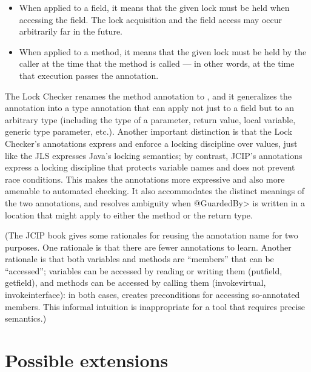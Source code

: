 \begin{itemize}
\item
  When applied to a field, it means that the given lock must be held when
  accessing the field.  The lock acquisition and the field access may occur
  arbitrarily far in the future.
\item
  When applied to a method, it means that the given lock must be held by
  the caller at the time that the method is called --- in other words, at
  the time that execution passes the  annotation.
\end{itemize}

The Lock Checker renames the method annotation to
, and it generalizes the
 annotation into a type annotation
that can apply not just to a field but to an arbitrary type (including the
type of a parameter, return value, local variable, generic type parameter,
etc.).  Another important distinction is that the Lock Checker's
annotations express and enforce a locking discipline over values, just like
the JLS expresses Java's locking semantics; by contrast, JCIP's annotations
express a locking discipline that protects variable names and does not
prevent race conditions.
  This makes the annotations more expressive and also more amenable
to automated checking.  It also accommodates the distinct
meanings of the two annotations, and resolves ambiguity when \<@GuardedBy>
is written in a location that might apply to either the method or the
return type.

(The JCIP book gives some rationales for reusing the annotation name for
two purposes.  One rationale is
that there are fewer annotations to learn.  Another rationale is
that both variables and methods are ``members'' that can be ``accessed'';
variables can be accessed by reading or writing them (putfield, getfield),
and methods can be accessed by calling them (invokevirtual,
invokeinterface):  in both cases,  creates preconditions
for accessing so-annotated members.  This informal intuition is
inappropriate for a tool that requires precise semantics.)



\section{Possible extensions\label{lock-extensions}}

